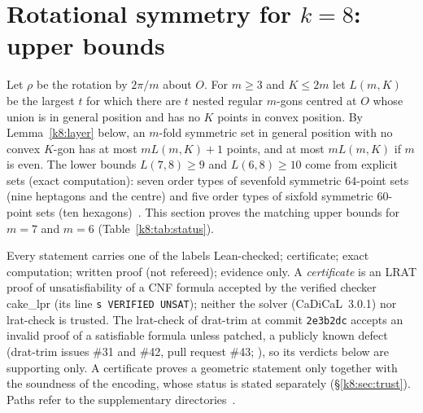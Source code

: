 
\section{Rotational symmetry for \texorpdfstring{$k=8$}{k=8}: upper bounds}\label{sec:k8}

Let $\rho$ be the rotation by $2\pi/m$ about $O$. For $m\ge3$ and $K\le 2m$ let $L(m,K)$ be the largest $t$ for which
there are $t$ nested regular $m$-gons centred at $O$ whose union is in general position and has no $K$ points in convex
position. By Lemma~\ref{k8:layer} below, an $m$-fold symmetric set in general position with no convex $K$-gon has at most
$mL(m,K)+1$ points, and at most $mL(m,K)$ if $m$ is even. The lower bounds $L(7,8)\ge9$ and $L(6,8)\ge10$ come from
explicit sets (exact computation): seven order types of sevenfold symmetric $64$-point sets (nine heptagons and the
centre) and five order types of sixfold symmetric $60$-point sets (ten
hexagons)~\cite[, , ]{Supp}. This section proves the matching upper bounds for
$m=7$ and $m=6$ (Table~\ref{k8:tab:status}).

Every statement carries one of the labels Lean-checked; certificate; exact computation; written proof
(not refereed); evidence only. A \emph{certificate} is an LRAT proof of unsatisfiability of a CNF formula accepted by
the verified checker cake\_lpr (its line \texttt{s VERIFIED UNSAT}); neither the solver (CaDiCaL~3.0.1) nor lrat-check
is trusted. The lrat-check of drat-trim at commit \texttt{2e3b2dc} accepts an invalid proof of a satisfiable formula
unless patched, a publicly known defect (drat-trim issues \#31 and \#42, pull request \#43; ), so
its verdicts below are supporting only. A certificate proves a
geometric statement only together with the soundness of the encoding, whose status is stated separately
(\S\ref{k8:sec:trust}). Paths refer to the supplementary directories~\cite{Supp}.

